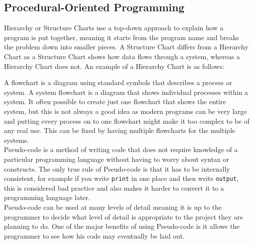 \documentclass[a4paper]{article}
\begin{document}
		\subsection{Procedural-Oriented Programming}
			Hierarchy or Structure Charts use a top-down approach to explain how a program is put together, meaning it starts from the program name and breaks the problem down into smaller pieces. A Structure Chart differs from a Hierarchy Chart as a Structure Chart shows how data flows through a system, whereas a Hierarchy Chart does not. An example of a Hierarchy Chart is as follows:
			\begin{figure}[H]
				\centering
			\end{figure}
			\noindent
			A flowchart is a diagram using standard symbols that describes a process or system. A system flowchart is a diagram that shows individual processes within a system. It often possible to create just one flowchart that shows the entire system, but this is not always a good idea as modern programs can be very large and putting every process on to one flowchart might make it too complex to be of any real use. This can be fixed by having multiple flowcharts for the multiple systems.\\
			Pseudo-code is a method of writing code that does not require knowledge of a particular programming language without having to worry about syntax or constructs. The only true rule of Pseudo-code is that it has to be internally consistent, for example if you write \verb|print| in one place and then write \verb|output|, this is considered bad practice and also makes it harder to convert it to a programming language later.\\
			Pseudo-code can be used at many levels of detail meaning it is up to the programmer to decide what level of detail is appropriate to the project they are planning to do. One of the major benefits of using Pseudo-code is it allows the programmer to see how his code may eventually be laid out.\\
\end{document}
